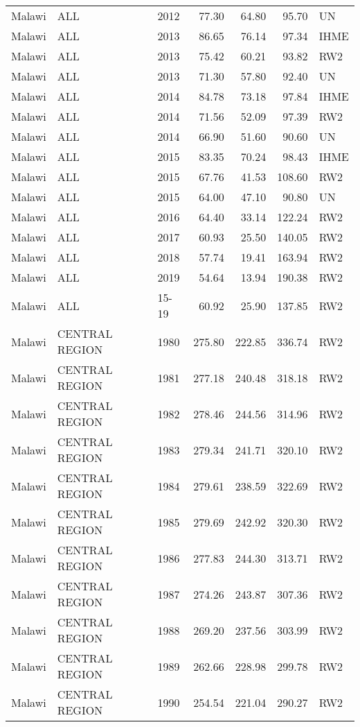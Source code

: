 \begin{longtable}{lllrrrl}
  Malawi & ALL & 2012 & 77.30 & 64.80 & 95.70 & UN \\ 
  Malawi & ALL & 2013 & 86.65 & 76.14 & 97.34 & IHME \\ 
  Malawi & ALL & 2013 & 75.42 & 60.21 & 93.82 & RW2 \\ 
  Malawi & ALL & 2013 & 71.30 & 57.80 & 92.40 & UN \\ 
  Malawi & ALL & 2014 & 84.78 & 73.18 & 97.84 & IHME \\ 
  Malawi & ALL & 2014 & 71.56 & 52.09 & 97.39 & RW2 \\ 
  Malawi & ALL & 2014 & 66.90 & 51.60 & 90.60 & UN \\ 
  Malawi & ALL & 2015 & 83.35 & 70.24 & 98.43 & IHME \\ 
  Malawi & ALL & 2015 & 67.76 & 41.53 & 108.60 & RW2 \\ 
  Malawi & ALL & 2015 & 64.00 & 47.10 & 90.80 & UN \\ 
  Malawi & ALL & 2016 & 64.40 & 33.14 & 122.24 & RW2 \\ 
  Malawi & ALL & 2017 & 60.93 & 25.50 & 140.05 & RW2 \\ 
  Malawi & ALL & 2018 & 57.74 & 19.41 & 163.94 & RW2 \\ 
  Malawi & ALL & 2019 & 54.64 & 13.94 & 190.38 & RW2 \\ 
  Malawi & ALL & 15-19 & 60.92 & 25.90 & 137.85 & RW2 \\ 
  Malawi & CENTRAL REGION & 1980 & 275.80 & 222.85 & 336.74 & RW2 \\ 
  Malawi & CENTRAL REGION & 1981 & 277.18 & 240.48 & 318.18 & RW2 \\ 
  Malawi & CENTRAL REGION & 1982 & 278.46 & 244.56 & 314.96 & RW2 \\ 
  Malawi & CENTRAL REGION & 1983 & 279.34 & 241.71 & 320.10 & RW2 \\ 
  Malawi & CENTRAL REGION & 1984 & 279.61 & 238.59 & 322.69 & RW2 \\ 
  Malawi & CENTRAL REGION & 1985 & 279.69 & 242.92 & 320.30 & RW2 \\ 
  Malawi & CENTRAL REGION & 1986 & 277.83 & 244.30 & 313.71 & RW2 \\ 
  Malawi & CENTRAL REGION & 1987 & 274.26 & 243.87 & 307.36 & RW2 \\ 
  Malawi & CENTRAL REGION & 1988 & 269.20 & 237.56 & 303.99 & RW2 \\ 
  Malawi & CENTRAL REGION & 1989 & 262.66 & 228.98 & 299.78 & RW2 \\ 
  Malawi & CENTRAL REGION & 1990 & 254.54 & 221.04 & 290.27 & RW2 \\ 

\end{longtable}
